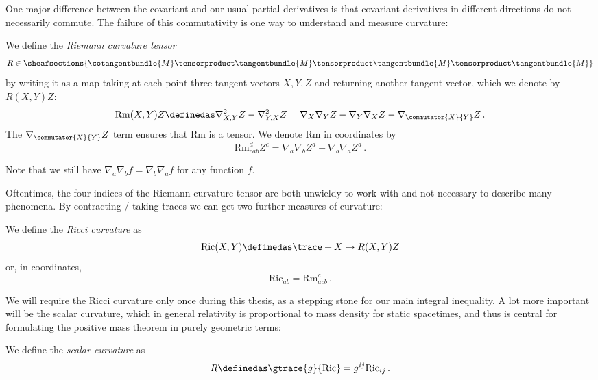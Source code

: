 \documentclass[titlepage,numbers=noenddot,oneside,%
cleardoublepage=empty,paper=a4,fontsize=11pt,%
english,%
]{scrartcl}
\newcommand*{\mathfullstop}{\,.}
\newcommand{\Ricci}{\mathrm{Ric}} %
\newcommand{\riemanncurvature}{\mathrm{Rm}} %
\begin{document}
One major difference between the covariant and our usual partial derivatives is that covariant derivatives in different directions do not necessarily commute. The failure of this commutativity is one way to understand and measure curvature:
\begin{definition}\label{def:riemann_curvature_tensor}
    We define the \emph{Riemann curvature tensor} 
    \begin{equation*}
        R\in \sheafsections{\cotangentbundle{M}\tensorproduct \tangentbundle{M}\tensorproduct \tangentbundle{M}\tensorproduct \tangentbundle{M}}
    \end{equation*} 
    by writing it as a map taking at each point three tangent vectors \( X,Y,Z \) and returning another tangent vector, which we denote by \( R(X,Y)Z \):
    \begin{equation*}
        \riemanncurvature(X,Y)Z\definedas \nabla^2_{X,Y}Z-\nabla^2_{Y,X}Z=\nabla_X \nabla_Y Z- \nabla_Y \nabla_X Z -\nabla_{\commutator{X}{Y}}Z\mathfullstop
    \end{equation*}
    The \( \nabla_{\commutator{X}{Y}}Z \) term ensures that \(  \riemanncurvature \) is a tensor. We denote \(  \riemanncurvature \) in coordinates by
    \begin{equation*}
        \riemanncurvature^d_{cab}Z^c=\nabla_a \nabla_b Z^d-\nabla_b \nabla_a Z^d\mathfullstop
    \end{equation*}
\end{definition}
\begin{remark}\label{rem:second_derivatives_function_commute}
    Note that we still have \( \nabla_a \nabla_b f=\nabla_b \nabla_a f \) for any function \( f \).
\end{remark}
Oftentimes, the four indices of the Riemann curvature tensor are both unwieldy to work with and not necessary to describe many phenomena. By contracting / taking traces we can get two further measures of curvature:
\begin{definition}
    We define the \emph{Ricci curvature} as
    \begin{equation*}
        \Ricci(X,Y)\definedas\trace+{X\mapsto R(X,Y)Z}
    \end{equation*}
    or, in coordinates,
    \begin{equation*}
        \Ricci_{ab}=\riemanncurvature^c_{acb}\mathfullstop
    \end{equation*}
\end{definition}
We will require the Ricci curvature only once during this thesis, as a stepping stone for our main integral inequality. A lot more important will be the scalar curvature, which in general relativity is proportional to mass density for static spacetimes, and thus is central for formulating the positive mass theorem in purely geometric terms:
\begin{definition}
    We define the \emph{scalar curvature} as
    \begin{equation*}
        R\definedas \gtrace{g}{\Ricci}=g^{ij}\Ricci_{ij}\mathfullstop
    \end{equation*}
\end{definition}
\end{document}
